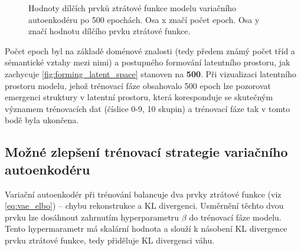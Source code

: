 \begin{figure}[H]
    \centering
    \qquad
    \caption{Hodnoty dílčích prvků ztrátové funkce modelu variačního autoenkodéru po 500 epochách. Osa x značí počet epoch. Osa y značí hodnotu dílčího prvku ztrátové funkce.}
    \label{fig:example}
\end{figure}

Počet epoch byl na základě doménové znalosti (tedy předem známý počet tříd a sémantické vztahy mezi nimi) a postupného formování latentního prostoru, jak zachycuje \autoref{fig:forming_latent_space} stanoven na \textbf{500}.
Při vizualizaci latentního prostoru modelu, jehož trénovací fáze obsahovalo 500 epoch lze pozorovat emergenci struktury v latentní prostoru, která koresponduje se skutečným významem trénovacích dat (číslice 0-9, 10 skupin) a trénovací fáze tak v tomto bodě byla ukončena.

\subsection{Možné zlepšení trénovací strategie variačního autoenkodéru}
Variační autoenkodér při trénování balancuje dva prvky ztrátové funkce (viz \autoref{eq:vae_elbo}) – chybu rekonstrukce a KL divergenci.
Usměrnění těchto dvou prvku lze dosáhnout zahrnutím hyperparametru $\beta$ do trénovací fáze modelu. 
Tento hypermarametr má skalární hodnota a slouží k násobení KL divergence prvku ztrátové funkce, tedy přiděluje KL divergenci váhu.

